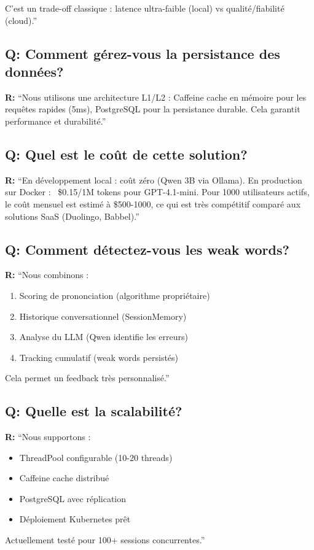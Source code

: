 \documentclass[12pt,a4paper,oneside]{report}
\begin{document}
C'est un trade-off classique : latence ultra-faible (local) vs qualité/fiabilité (cloud).''

\subsection{Q: Comment gérez-vous la persistance des données?}

\textbf{R:} ``Nous utilisons une architecture L1/L2 : 
Caffeine cache en mémoire pour les requêtes rapides (5ms), 
PostgreSQL pour la persistance durable. 
Cela garantit performance et durabilité.''

\subsection{Q: Quel est le coût de cette solution?}

\textbf{R:} ``En développement local : coût zéro (Qwen 3B via Ollama). 
En production sur Docker : ~\$0.15/1M tokens pour GPT-4.1-mini. 
Pour 1000 utilisateurs actifs, le coût mensuel est estimé à \$500-1000, 
ce qui est très compétitif comparé aux solutions SaaS (Duolingo, Babbel).''

\subsection{Q: Comment détectez-vous les weak words?}

\textbf{R:} ``Nous combinons :
\begin{enumerate}
    \item Scoring de prononciation (algorithme propriétaire)
    \item Historique conversationnel (SessionMemory)
    \item Analyse du LLM (Qwen identifie les erreurs)
    \item Tracking cumulatif (weak words persistés)
\end{enumerate}

Cela permet un feedback très personnalisé.''

\subsection{Q: Quelle est la scalabilité?}

\textbf{R:} ``Nous supportons :
\begin{itemize}
    \item ThreadPool configurable (10-20 threads)
    \item Caffeine cache distribué
    \item PostgreSQL avec réplication
    \item Déploiement Kubernetes prêt
\end{itemize}

Actuellement testé pour 100+ sessions concurrentes.''
\end{document}
